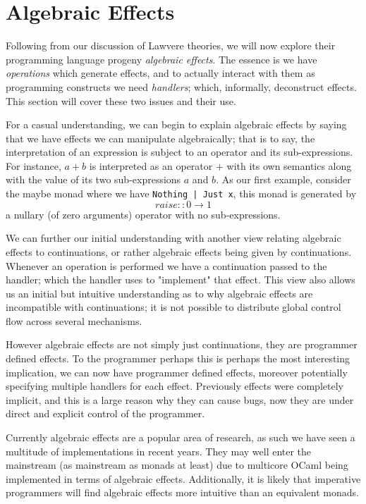 \section{Algebraic Effects}
Following from our discussion of Lawvere theories,
we will now explore their programming language progeny \textit{algebraic effects}.
The essence is we have \textit{operations} which generate effects,
and to actually interact with them as programming constructs
we need \textit{handlers}\cite{plotkin2009handlers};
which, informally, deconstruct effects.
This section will cover these two issues and their use.

For a casual understanding,
we can begin to explain algebraic effects by saying that
we have effects we can manipulate algebraically; that is to say,
the interpretation of an expression is
subject to an operator and its sub-expressions.
For instance, $a + b$ is interpreted as an operator
$+$ with its own semantics along with the value of its
two sub-expressions $a$ and $b$.
As our first example, consider the maybe monad where we have
\texttt{Nothing | Just x},
this monad is generated by
\begin{equation}
    raise :: 0 \rightarrow 1
\end{equation}
a nullary (of zero arguments) operator with no sub-expressions.

We can further our initial understanding with another view
relating algebraic effects to continuations,
or rather algebraic effects being given by continuations.
Whenever an operation is performed we have a continuation
passed to the handler;
which the handler uses to "implement" that effect.
This view also allows us an initial but intuitive
understanding as to why algebraic effects are incompatible with continuations;
it is not possible to distribute global control flow across several mechanisms.

However algebraic effects are not simply just continuations,
they are programmer defined effects.
To the programmer perhaps this is perhaps the most interesting implication,
we can now have programmer defined effects,
moreover potentially specifying multiple handlers for each effect.
Previously effects were completely implicit,
and this is a large reason why they can cause bugs,
now they are under direct and explicit control of the programmer.

Currently algebraic effects are a popular area of research,
as such we have seen a multitude of implementations in recent years.
They may well enter the mainstream (as mainstream as monads at least)
due to multicore OCaml being implemented in terms of algebraic effects.
Additionally, it is likely that imperative programmers
will find algebraic effects more intuitive than an equivalent monads.

